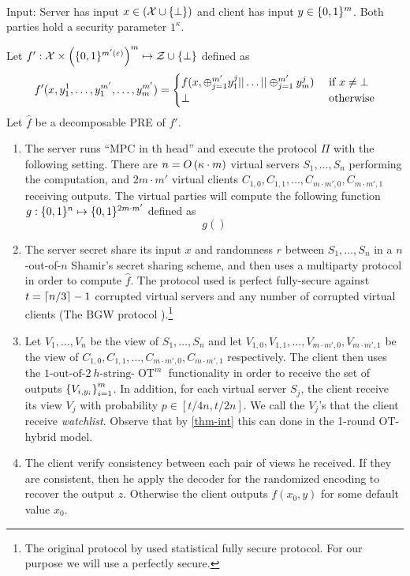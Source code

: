 \documentclass{llncs}
\newcommand{\OT}{\operatorname{OT}}
\newcommand{\sOT}[3]{#1\text{-out-of-}#2~#3\text{-string-}\OT}
\newcommand{\X}{\mathcal{X}}
\renewcommand{\Z}{\mathcal{Z}}
\newcommand{\IKOPS}{\operatorname{IKOPS}}
\begin{document}
\begin{protocol}[$\Pi_{\IKOPS}\of{\eps}$]~

Input: Server has input $x\in(\X\cup\set{\bot})$ and client has input $y\in\{0,1\}^m$. Both parties hold a security parameter $1^{\kappa}$.

Let $f':\X\times\left(\zo^{m'(\eps)}\right)^{ m}\mapsto\Z\cup\set{\bot}$ defined as
$$f'(x,y_1^1,\ldots,y_1^{m'},\ldots,y_m^{m'})=
\begin{cases}
f(x,\oplus_{j=1}^{m'}y_1^j||\ldots||\oplus_{j=1}^{m'}y_m^j)&\text{ if }x\ne\bot\\
\bot&\text{ otherwise}
\end{cases}
$$
Let $\hat{f}$ be a decomposable PRE of $f'$.

\begin{enumerate}
	\item The server runs ``MPC in th head'' and execute the protocol $\Pi$ with the following setting. There are $n=O\left ( \kappa\cdot m \right )$ virtual servers $S_1,\ldots,S_n$ performing the computation, and $2m\cdot m'$ virtual clients $C_{1,0},C_{1,1},\ldots,C_{m\cdot m',0},C_{m\cdot m',1}$ receiving outputs. The virtual parties will compute the following function $g:\{0,1\}^{n}\mapsto\{0,1\}^{2m\cdot m'}$ defined as
    $$g()$$
    
    \item\label{item:IKOPScomp} The server secret share its input $x$ and randomness $r$ between $S_1,\ldots,S_n$ in a $n$-out-of-$n$ Shamir's secret sharing scheme, and then uses a multiparty protocol in order to compute $\hat{f}$. The protocol used is perfect fully-secure against $t=\left\lceil n/3 \right\rceil-1$ corrupted virtual servers and any number of corrupted virtual clients (\eg The BGW protocol \cite{BGW88}).\footnote{The original protocol by \cite{IKOPS11} used statistical fully secure protocol. For our purpose we will use a perfectly secure.}
    
    \item Let $V_1,\ldots,V_n$ be the view of $S_1,\ldots,S_n$ and let $V_{1,0},V_{1,1},\ldots,V_{m\cdot m',0},V_{m\cdot m',1}$ be the view of $C_{1,0},C_{1,1},\ldots,C_{m\cdot m',0},C_{m\cdot m',1}$ respectively. The client then uses the $\sOT{1}{2}{h}^m$ functionality in order to receive the set of outputs $\left\{V_{i,y_i}\right\}_{i=1}^m$. In addition, for each virtual server $S_j$, the client receive its view $V_j$ with probability $p\in[t/4n,t/2n]$. We call the $V_j$'s that the client receive \emph{watchlist}. Observe that by \cref{thm-int} this can done in the 1-round OT-hybrid model.
    
    \item The client verify consistency between each pair of views he received. If they are consistent, then he apply the decoder for the randomized encoding to recover the output $z$. Otherwise the client outputs $f(x_0,y)$ for some default value $x_0$.
\end{enumerate}
\end{protocol}
\end{document}
